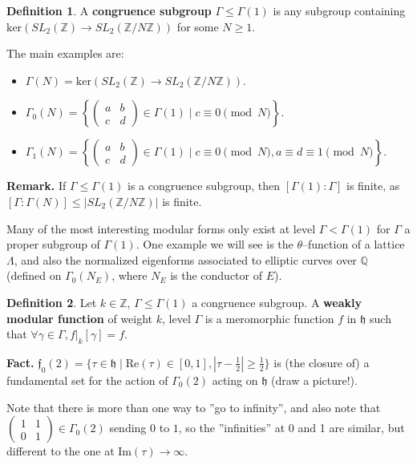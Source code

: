 \documentclass{article}
\theoremstyle{definition}
\newtheorem{defn}{Definition}[section]
\begin{document}
\begin{defn}
    A \textbf{congruence subgroup} $\Gamma\le \Gamma(1)$ is any subgroup containing $\text{ker}(SL_2(\mathbb{Z}) \to SL_2(\mathbb{Z}/N \mathbb{Z}))$ for some $N\ge 1$.
\end{defn}
The main examples are:
\begin{itemize}
    \item $\Gamma(N) = \text{ker}(SL_2(\mathbb{Z}) \to SL_2(\mathbb{Z}/N \mathbb{Z}))$.
    \item $\Gamma_0(N) = \left\{\begin{pmatrix} a&b\\c&d \end{pmatrix} \in \Gamma(1) \mid c \equiv 0\pmod{N}\right\}$.
    \item $\Gamma_1(N) = \left\{\begin{pmatrix} a&b\\c&d \end{pmatrix} \in \Gamma(1) \mid c \equiv 0\pmod{N}, a \equiv d \equiv 1 \pmod{N}\right\}$.
\end{itemize}
\textbf{Remark.} If $\Gamma\le \Gamma(1)$ is a congruence subgroup, then $[\Gamma(1):\Gamma]$ is finite, as $[\Gamma:\Gamma(N)]\le |SL_2(\mathbb{Z}/N\mathbb{Z})|$ is finite.
\vspace{1mm}
 
Many of the most interesting modular forms only exist at level $\Gamma<\Gamma(1)$ for $\Gamma$ a proper subgroup of $\Gamma(1)$. One example we will see is the $\theta$--function of a lattice $\Lambda$, and also the normalized eigenforms associated to elliptic curves over $\mathbb{Q}$ (defined on $\Gamma_0(N_E)$, where $N_E$ is the conductor of $E$).

\begin{defn}
    Let $k \in \mathbb{Z}$, $\Gamma\le \Gamma(1)$ a congruence subgroup. A \textbf{weakly modular function} of weight $k$, level $\Gamma$ is a meromorphic function $f$ in $\mathfrak{h}$ such that $\forall \gamma \in \Gamma, f|_k[\gamma] = f$.
\end{defn}
\textbf{Fact.} $\mathfrak{f}_0(2) = \{\tau \in \mathfrak{h} \mid \text{Re}(\tau) \in [0,1], |\tau-\frac{1}{2}|\ge \frac{1}{2}\}$ is (the closure of) a fundamental set for the action of $\Gamma_0(2)$ acting on $\mathfrak{h}$ (draw a picture!). 

Note that there is more than one way to ''go to infinity'', and also note that $\begin{pmatrix} 1&1\\0&1 \end{pmatrix} \in \Gamma_0(2)$ sending $0$ to $1$, so the ''infinities'' at 0 and 1 are similar, but different to the one at $\text{Im}(\tau) 
\to \infty$.
\end{document}
